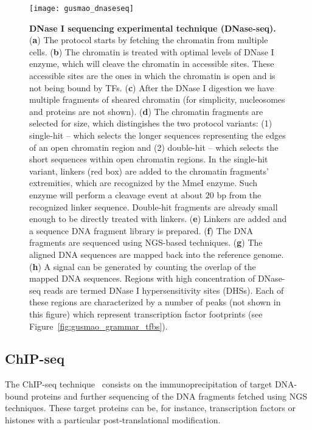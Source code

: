 \begin{figure}[h!]
\centering
\texttt{[image: gusmao\_dnaseseq]}
\caption[DNase I sequencing experimental technique (DNase-seq)]{\textbf{DNase I sequencing experimental technique (DNase-seq).} (\textbf{a}) The protocol starts by fetching the chromatin from multiple cells. (\textbf{b}) The chromatin is treated with optimal levels of DNase I enzyme, which will cleave the chromatin in accessible sites. These accessible sites are the ones in which the chromatin is open and is not being bound by TFs. (\textbf{c}) After the DNase I digestion we have multiple fragments of sheared chromatin (for simplicity, nucleosomes and proteins are not shown). (\textbf{d}) The chromatin fragments are selected for size, which distingishes the two protocol variants: (1) single-hit -- which selects the longer sequences representing the edges of an open chromatin region and (2) double-hit -- which selects the short sequences within open chromatin regions. In the single-hit variant, linkers (red box) are added to the chromatin fragments' extremities, which are recognized by the MmeI enzyme. Such enzyme will perform a cleavage event at about $20$ bp from the recognized linker sequence. Double-hit fragments are already small enough to be directly treated with linkers. (\textbf{e}) Linkers are added and a sequence DNA fragment library is prepared. (\textbf{f}) The DNA fragments are sequenced using NGS-based techniques. (\textbf{g}) The aligned DNA sequences are mapped back into the reference genome. (\textbf{h}) A signal can be generated by counting the overlap of the mapped DNA sequences. Regions with high concentration of DNase-seq reads are termed DNase I hypersensitivity sites (DHSs). Each of these regions are characterized by a number of peaks (not shown in this figure) which represent transcription factor footprints (see Figure~\ref{fig:gusmao_grammar_tfbs}).}
\label{fig:gusmao_dnaseseq}
\end{figure}

\subsection{ChIP-seq}
\label{sec:chip.seq}

The ChIP-seq technique~\cite{johnson2007} consists on the immunoprecipitation of target DNA-bound proteins and further sequencing of the DNA fragments fetched using NGS techniques. These target proteins can be, for instance, transcription factors or histones with a particular post-translational modification.

